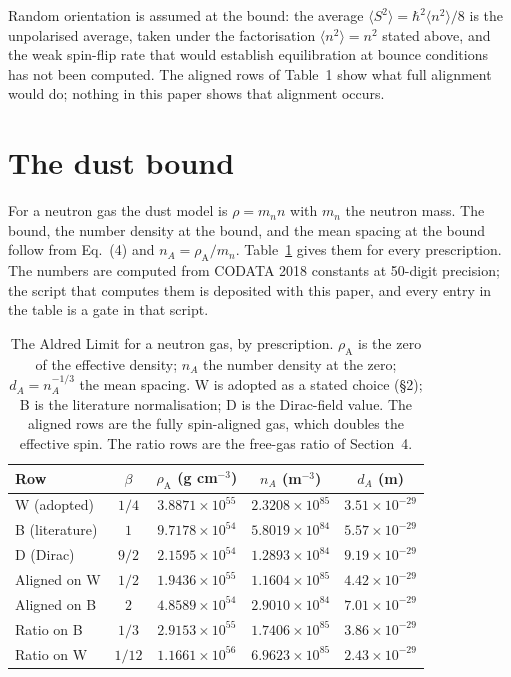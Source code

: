 \documentclass[11pt]{article}
\newcommand{\rhoA}{\rho_{\mathrm{A}}}
\begin{document}
Random orientation is assumed at the bound: the average
$\langle S^2\rangle = \hbar^2\langle n^2\rangle/8$ is the unpolarised
average, taken under the factorisation $\langle n^2\rangle = n^2$
stated above, and the weak spin-flip rate that would establish
equilibration at bounce conditions has not been computed. The aligned rows of Table~1 show what
full alignment would do; nothing in this paper shows that alignment
occurs.

\section{The dust bound}

For a neutron gas the dust model is $\rho = m_n n$ with $m_n$ the
neutron mass. The bound, the number density at the bound, and the mean
spacing at the bound follow from Eq.~(4) and $n_A = \rhoA/m_n$.
Table~\ref{tab:bound} gives them for every prescription. The numbers are
computed from CODATA 2018 constants at 50-digit precision; the script
that computes them is deposited with this paper, and every entry in the
table is a gate in that script.

\begin{table}[h]
\centering
\caption{The Aldred Limit for a neutron gas, by prescription.
$\rhoA$ is the zero of the effective density; $n_A$ the number density
at the zero; $d_A = n_A^{-1/3}$ the mean spacing. W is adopted as a
stated choice (\S2); B is the literature normalisation; D is the
Dirac-field value. The aligned rows are the fully spin-aligned gas,
which doubles the effective spin. The ratio rows are the free-gas ratio
of Section~4.}\label{tab:bound}
\begin{tabular}{lcccc}
\toprule
Row & $\beta$ & $\rhoA$ (g cm$^{-3}$) & $n_A$ (m$^{-3}$) & $d_A$ (m) \\
\midrule
W (adopted) & $1/4$ & $3.8871\times10^{55}$ & $2.3208\times10^{85}$ & $3.51\times10^{-29}$ \\
B (literature) & $1$ & $9.7178\times10^{54}$ & $5.8019\times10^{84}$ & $5.57\times10^{-29}$ \\
D (Dirac) & $9/2$ & $2.1595\times10^{54}$ & $1.2893\times10^{84}$ & $9.19\times10^{-29}$ \\
Aligned on W & $1/2$ & $1.9436\times10^{55}$ & $1.1604\times10^{85}$ & $4.42\times10^{-29}$ \\
Aligned on B & $2$ & $4.8589\times10^{54}$ & $2.9010\times10^{84}$ & $7.01\times10^{-29}$ \\
Ratio on B & $1/3$ & $2.9153\times10^{55}$ & $1.7406\times10^{85}$ & $3.86\times10^{-29}$ \\
Ratio on W & $1/12$ & $1.1661\times10^{56}$ & $6.9623\times10^{85}$ & $2.43\times10^{-29}$ \\
\bottomrule
\end{tabular}
\end{table}
\end{document}
